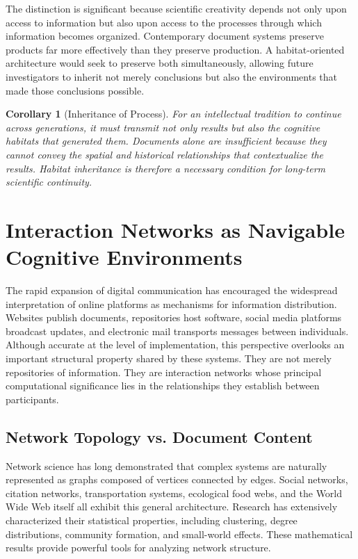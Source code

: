 \documentclass[12pt,oneside]{article}
\newtheorem{corollary}[definition]{Corollary}
\theoremstyle{remark}
\begin{document}
The distinction is significant because scientific creativity depends not only upon access to information but also upon access to the processes through which information becomes organized. Contemporary document systems preserve products far more effectively than they preserve production. A habitat-oriented architecture would seek to preserve both simultaneously, allowing future investigators to inherit not merely conclusions but also the environments that made those conclusions possible.

\begin{corollary}[Inheritance of Process]
For an intellectual tradition to continue across generations, it must transmit not only results but also the cognitive habitats that generated them. Documents alone are insufficient because they cannot convey the spatial and historical relationships that contextualize the results. Habitat inheritance is therefore a necessary condition for long-term scientific continuity.
\end{corollary}



\section{Interaction Networks as Navigable Cognitive Environments}

The rapid expansion of digital communication has encouraged the widespread interpretation of online platforms as mechanisms for information distribution. Websites publish documents, repositories host software, social media platforms broadcast updates, and electronic mail transports messages between individuals. Although accurate at the level of implementation, this perspective overlooks an important structural property shared by these systems. They are not merely repositories of information. They are interaction networks whose principal computational significance lies in the relationships they establish between participants.

\subsection{Network Topology vs. Document Content}

Network science has long demonstrated that complex systems are naturally represented as graphs composed of vertices connected by edges. Social networks, citation networks, transportation systems, ecological food webs, and the World Wide Web itself all exhibit this general architecture. Research has extensively characterized their statistical properties, including clustering, degree distributions, community formation, and small-world effects. These mathematical results provide powerful tools for analyzing network structure.
\end{document}

